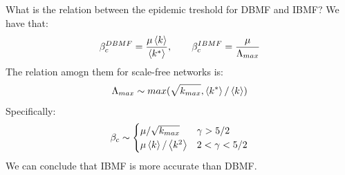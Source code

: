\documentclass[../main/main.tex]{subfiles}
\begin{document}
What is the relation between the epidemic treshold for DBMF and IBMF?
We have that:
\begin{equation*}
  \beta _c^{DBMF} = \frac{\mu \expval{k} }{\expval{k^*} }, \qquad \beta _c^{IBMF} = \frac{\mu }{\Lambda _{max}}
\end{equation*}
The relation amogn them for scale-free networks is:
\begin{equation*}
  \Lambda _{max} \sim max(\sqrt{k_{max}}, \expval{k^*}/\expval{k}   )
\end{equation*}
Specifically:
\begin{equation*}
\beta _c \sim
  \begin{cases}
   \mu / \sqrt{k_{max}} & \gamma > 5/2  \\
   \mu \expval{k}/\expval{k^2} & 2 < \gamma < 5/2
  \end{cases}
\end{equation*}
We can conclude that IBMF is more accurate than DBMF.
\end{document}
